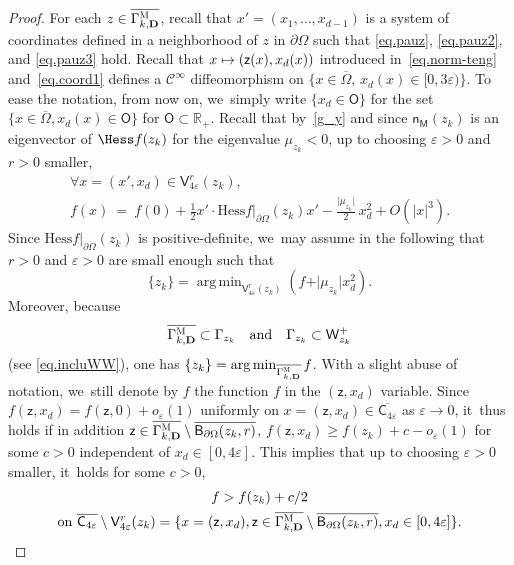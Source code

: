 \documentclass[JEP,XML,SOM,Unicode,NoEqCountersInSection,NoFloatCountersInSection,published]{cedram}
\newcommand\mto{\mathchoice{\longmapsto}{\mapsto}{\mapsto}{\mapsto}}
\newcommand{\quand}{\quad\text{and}\quad}
\newcommand{\mbf}[1]{\mathbf{#1}}
\let\ve\varepsilon
\DeclareMathOperator*{\argmin}{arg\,min}
\theoremstyle{plain}
\theoremstyle{definition}
\begin{document}
\begin{proof}
For each $z\in \overline{ \Gamma_{k,\mbf D}^{\textsc{M}}}$, recall
that $x'=(x_1,\ldots,x_{d-1})$ is a system of coordinates defined
in a neighborhood of $z$ in $\partial \Omega$ such that
\eqref{eq.pauz}, \eqref{eq.pauz2}, and \eqref{eq.pauz3} hold. Recall
that $x\mto (\mathsf z(x),x_d(x))$ introduced
in~\eqref{eq.norm-teng} and~\eqref{eq.coord1} defines a $\mathcal C^\infty$ diffeomorphism on $\{x\in\overline\Omega,\, x_d(x)\in [0,3\ve)\}$. To ease the notation, from now on, we~simply write $\{ x_d \in \mathsf O\}$ for the set $\{x\in \overline \Omega, x_d(x) \in \mathsf O\}$ for $\mathsf O\subset \mathbb R_+$.
Recall that by~\eqref{g_y} and since $\mathsf n_{\mathsf M}(z_k)$ is an eigenvector of $\Hess f(z_k)$ for the eigenvalue $\mu_{z_k}<0$,
up to choosing $\ve>0$ and $r>0$ smaller,\vspace*{-4pt}
\begin{multline}\label{eq.DLzk}
\forall x=(x',x_d)\in \mathsf V_{4\ve}^r(z_k), \\ f(x)\ =\ f(0)+ \frac 12 x' \cdot \text{Hess} f|_{\partial \Omega} (z_k)x' - \frac{\vert \mu_{z_k}\vert }{2}\, x_d^2 + O(\vert x\vert^3).
\end{multline}
Since $\text{Hess} f|_{\partial \Omega} (z_k)$ is positive-definite, we~may assume in the following that $r>0$ and $\ve>0$ are small enough such that\vspace*{-3pt}
\begin{equation}\label{eq.min-zK}
\{z_k\}=\argmin_{ { \mathsf V_{4\ve}^r(z_k)}} (f+ \vert \mu_{z_k} \vert x_d^2).
\end{equation}
Moreover, because\vspace*{-4pt}
\[
\overline{ \Gamma_{k,\mbf D}^{\textsc{M}}}\subset \Gamma_{z_k}\quand \Gamma_{z_k}\subset \mathsf W_{z_k}^+
\]
(see \eqref{eq.incluWW}), one has
$\{z_k\}=\argmin_{\overline{ \Gamma_{k,\mbf D}^{\textsc{M}}}}f$.
With a slight abuse of notation, we~still denote by $f$ the function $f$ in the $(\mathsf z,x_d)$ variable.
Since $f(\mathsf z,x_d)= f(\mathsf z,0)+o_{\ve}(1)$ uniformly on $x=(\mathsf z,x_d)\in \overline{\mathsf C_{4\ve}}$ as $\ve \to 0$, it~thus holds if in addition $\mathsf z\in \overline{ \Gamma_{k,\mbf D}^{\textsc{M}}}\setminus \overline{\mathsf B_{\partial \Omega}(z_k,r)}$, $f(\mathsf z,x_d)\ge f(z_k)+c-o_{\ve}(1)$ for some $c>0$ independent of $x_d\in [0,4\ve]$. This implies that up to choosing $\ve >0$ smaller, it~holds for some $c>0$,
\begin{multline}\label{eq.min>>zK}
f> f(z_k)+c/2\\ \text{on}\ \overline{\mathsf C_{4\ve}}\setminus \mathsf V_{4\ve}^r(z_k)=\{x=(\mathsf z,x_d), \mathsf z\in \overline{ \Gamma_{k,\mbf D}^{\textsc{M}}}\setminus \overline{\mathsf B_{\partial \Omega}(z_k,r)}, x_d\in [0,4\ve]\}.
\end{multline}


\end{proof}
\end{document}
